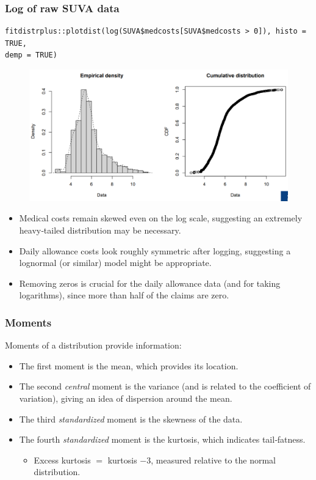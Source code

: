 \documentclass[11pt]{article}
\newcommand{\noi}{\noindent}
\begin{document}
\subsubsection*{Log of raw SUVA data}
\begin{lstlisting}
fitdistrplus::plotdist(log(SUVA$medcosts[SUVA$medcosts > 0]), histo = TRUE,
demp = TRUE)
\end{lstlisting}
\begin{figure}[H]
    \centering
    \includegraphics[width=0.7\linewidth]{SUVA data - log plot.png}
\end{figure}

\begin{itemize}
  \item Medical costs remain skewed even on the log scale, suggesting an extremely heavy‐tailed distribution may be necessary.
  \item Daily allowance costs look roughly symmetric after logging, suggesting a lognormal (or similar) model might be appropriate.
  \item Removing zeros is crucial for the daily allowance data (and for taking logarithms), since more than half of the claims are zero.
\end{itemize}

\subsubsection{Moments}
\noi Moments of a distribution provide information:
\begin{itemize}
  \item The first moment is the mean, which provides its location.
  \item The second \emph{central} moment is the variance (and is related to the coefficient of variation), giving an idea of dispersion around the mean.
  \item The third \emph{standardized} moment is the skewness of the data.
  \item The fourth \emph{standardized} moment is the kurtosis, which indicates tail‐fatness.
    \begin{itemize}
      \item Excess kurtosis $=$ kurtosis $-3$, measured relative to the normal distribution.
    \end{itemize}
\end{itemize}
\end{document}
